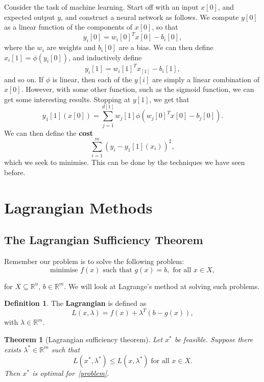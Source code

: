 \documentclass[12pt]{article}
\newtheorem{theorem}{Theorem}[section]
\theoremstyle{definition}
\newtheorem{definition}{Definition}[section]
\theoremstyle{remark}
\begin{document}
Consider the task of machine learning. Start off with an input $x[0]$, and expected output $y$, and construct a neural network as follows. We compute $y[0]$ as a linear function of the components of $x[0]$, so that
\[
	y_i[0] = w_i[0]^{T} x[0] - b_i[0]
,\]
where the $w_i$ are weights and $b_i[0]$ are a bias. We can then define $x_i[1] = \phi(y_i[0])$, and inductively define
 \[
	 y_i[1] = w_i[1]^{T}x_[1] - b_i[1]
,\]
and so on. If $\phi$ is linear, then each of the $y[i]$ are simply a linear combination of $x[0]$. However, with some other function, such as the sigmoid function, we can get some interesting results. Stopping at $y[1]$, we get that
\[
	y_1[1](x[0]) = \sum_{j = 1}^{d[1]} w_j[1] \phi(w_j[0]^{T} x[0] - b_j[0])
.\]
We can then define the \textbf{cost}
\[
	\sum_{i = 1}^{m} (y_i - y_1[1](x_i) )^2
,\]
which we seek to minimise. This can be done by the techniques we have seen before.

\newpage

\section{Lagrangian Methods}%
\label{sec:lagrangian_methods}

\subsection{The Lagrangian Sufficiency Theorem}%
\label{sub:the_lagrangian_sufficiency_theorem}

Remember our problem is to solve the following problem:
\[
	\text{minimise } f(x) \text{ such that } g(x) = b, \text{ for all } x \in X \tag{P}\label{problem}
,\] 

for $X \subseteq \mathbb{R}^{n}$, $b \in \mathbb{R}^{m}$. We will look at Lagrange's method at solving such problems.

\begin{definition}
	The \textbf{Lagrangian} is defined as
	\[
		L(x, \lambda) = f(x) + \lambda^{T}(b - g(x))
	,\]
	with $\lambda \in \mathbb{R}^{m}$.
\end{definition}

\begin{theorem}[Lagrangian sufficiency theorem]
	Let $x^{\ast}$ be feasible. Suppose there exists $\lambda^{\ast} \in \mathbb{R}^{m}$ such that
	\[
		L(x^{\ast}, \lambda^{\ast}) \leq L(x, \lambda^{\ast}) \; \text{for all } x \in X
	.\]
	Then $x^{\ast}$ is optimal for~\eqref{problem}.
\end{theorem}
\end{document}
